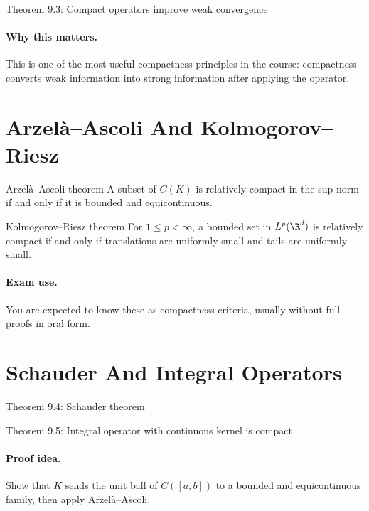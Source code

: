 \documentclass[11pt]{article}
\begin{document}
\begin{thmbox}{Theorem 9.3: Compact operators improve weak convergence}
\thmCompactWeakToStrong
\end{thmbox}

\paragraph{Why this matters.}
This is one of the most useful compactness principles in the course: compactness converts weak information into strong information after applying the operator.

\section{Arzel\`a--Ascoli And Kolmogorov--Riesz}

\begin{thmbox}{Arzel\`a--Ascoli theorem}
A subset of $C(K)$ is relatively compact in the sup norm if and only if it is bounded and equicontinuous.
\end{thmbox}

\begin{thmbox}{Kolmogorov--Riesz theorem}
For $1\le p<\infty$, a bounded set in $L^p(\R^d)$ is relatively compact if and only if translations are uniformly small and tails are uniformly small.
\end{thmbox}

\paragraph{Exam use.}
You are expected to know these as compactness criteria, usually without full proofs in oral form.

\section{Schauder And Integral Operators}

\begin{thmbox}{Theorem 9.4: Schauder theorem}
\thmSchauder
\end{thmbox}

\begin{thmbox}{Theorem 9.5: Integral operator with continuous kernel is compact}
\thmIntegralOperator
\end{thmbox}

\paragraph{Proof idea.}
Show that $K$ sends the unit ball of $C([a,b])$ to a bounded and equicontinuous family, then apply Arzel\`a--Ascoli.
\end{document}
